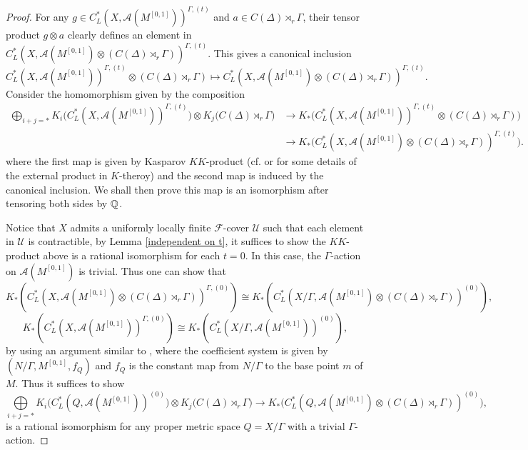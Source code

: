 \documentclass[11pt]{article}
\theoremstyle{definition}
\theoremstyle{plain}
\def\A{\mathcal A}\def\C{\mathcal C}\def\B{\mathcal B}\def\E{\mathcal E}\def\O{\mathcal O}\def\h{\mathfrak h}\def\K{\mathcal K}\def\F{\mathcal F}\def\P{\mathcal P}\def\L{\mathcal L}\def\R{\mathcal R}\def\Q{\mathcal Q}\def\H{\mathcal H}\def\S{\mathcal S}\def\N{\mathcal N}\def\U{\mathcal U}\def\V{\mathcal V}
\def\ox{\otimes}
\def\ox{\otimes}
\def\Ga{\Gamma}
\begin{document}
\begin{proof}
For any  $g\in C^*_L(X,\A(M^{[0,1]}))^{\Ga,(t)}$ and $a\in C(\Delta)\rtimes_r\Ga$, their tensor product $g\ox a$ clearly defines an element in $C^*_L(X,\A(M^{[0,1]})\ox(C(\Delta)\rtimes_r\Ga))^{\Ga,(t)}$. This gives a canonical inclusion
$$C^*_L\left(X,\A(M^{[0,1]})\right)^{\Ga,(t)}\ox (C(\Delta)\rtimes_r\Ga)\mapsto C^*_L\left(X,\A(M^{[0,1]})\ox(C(\Delta)\rtimes_r\Ga)\right)^{\Ga,(t)}.$$
Consider the homomorphism given by the composition
\[\begin{split}\bigoplus\limits_{i+j=*} K_{i}\Big( C_L^*\left(X,\mathcal{A}(M^{[0,1]}) \right)^{\Gamma,(t)} \Big) \otimes K_{j}\Big( C(\Delta) \rtimes_r \Gamma  \Big)&\to K_*\Big(C^*_L\left(X,\A(M^{[0,1]})\right)^{\Ga,(t)}\ox(C(\Delta)\rtimes_r\Ga)\Big)\\
&\to K_*\Big(C^*_L\left(X,\A(M^{[0,1]})\ox(C(\Delta)\rtimes_r\Ga)\right)^{\Ga,(t)}\Big).\end{split}\]
where the first map is given by Kasparov $KK$-product (cf. \cite{Kas88} or \cite[Section 2.10]{HIT2020} for some details of the external product in $K$-theroy) and the second map is induced by the canonical inclusion. We shall then prove this map is an isomorphism after tensoring both sides by $\mathbb Q$.

Notice that $X$ admits a uniformly locally finite $\F$-cover $\U$ such that each element in $\U$ is contractible, by Lemma \ref{independent on t}, it suffices to show the $KK$-product above is a rational isomorphism for each $t=0$. In this case, the $\Ga$-action on $\A(M^{[0,1]})$ is trivial. Thus one can show that
$$K_*\left(C^*_L\left(X,\A(M^{[0,1]})\ox(C(\Delta)\rtimes_r\Ga)\right)^{\Ga,(0)}\right)\cong K_*\left(C^*_L\left(X/\Ga,\A(M^{[0,1]})\ox(C(\Delta)\rtimes_r\Ga)\right)^{(0)}\right),$$
$$K_*\left(C^*_L\left(X,\A(M^{[0,1]})\right)^{\Ga,(0)}\right)\cong K_*\left(C^*_L\left(X/\Ga,\A(M^{[0,1]})\right)^{(0)}\right),$$
by using an argument similar to \cite[Theorem 6.5.15]{HIT2020}, where the coefficient system is given by $(N/\Ga,M^{[0,1]},f_Q)$ and $f_Q$ is the constant map from $N/\Ga$ to the base point $m$ of $M$. Thus it suffices to show
$$\bigoplus\limits_{i+j=*} K_{i}\Big( C_L^*\left(Q,\mathcal{A}(M^{[0,1]}) \right)^{(0)} \Big) \otimes K_{j} \Big( C(\Delta) \rtimes_r \Gamma  \Big)\to K_*\Big(C^*_L\left(Q,\A(M^{[0,1]})\ox(C(\Delta)\rtimes_r\Ga)\right)^{(0)}\Big),$$
is a rational isomorphism for any proper metric space $Q=X/\Ga$ with a trivial $\Ga $-action.


\end{proof}
\end{document}
